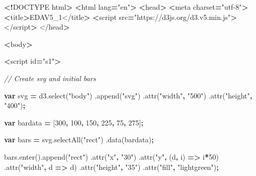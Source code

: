 \documentclass[openany]{book}
\newenvironment{Shaded}{\begin{snugshade}}{\end{snugshade}}
\newcommand{\AttributeTok}[1]{\textcolor[rgb]{0.77,0.63,0.00}{#1}}
\newcommand{\CommentTok}[1]{\textcolor[rgb]{0.56,0.35,0.01}{\textit{#1}}}
\newcommand{\DecValTok}[1]{\textcolor[rgb]{0.00,0.00,0.81}{#1}}
\newcommand{\KeywordTok}[1]{\textcolor[rgb]{0.13,0.29,0.53}{\textbf{#1}}}
\newcommand{\NormalTok}[1]{#1}
\newcommand{\OperatorTok}[1]{\textcolor[rgb]{0.81,0.36,0.00}{\textbf{#1}}}
\newcommand{\StringTok}[1]{\textcolor[rgb]{0.31,0.60,0.02}{#1}}
\newcommand{\VariableTok}[1]{\textcolor[rgb]{0.00,0.00,0.00}{#1}}
\begin{document}
\begin{Shaded}
\begin{Highlighting}[]
\OperatorTok{<!}\NormalTok{DOCTYPE html}\OperatorTok{>}
\OperatorTok{<}\NormalTok{html lang}\OperatorTok{=}\StringTok{"en"}\OperatorTok{>}
  \OperatorTok{<}\NormalTok{head}\OperatorTok{>}
    \OperatorTok{<}\NormalTok{meta charset}\OperatorTok{=}\StringTok{"utf-8"}\OperatorTok{>}
    \OperatorTok{<}\NormalTok{title}\OperatorTok{>}\NormalTok{EDAV5_1</title}\OperatorTok{>}
    \OperatorTok{<}\NormalTok{script src}\OperatorTok{=}\StringTok{"https://d3js.org/d3.v5.min.js"}\OperatorTok{>}\NormalTok{</script}\OperatorTok{>}
\NormalTok{  </head}\OperatorTok{>}

  \OperatorTok{<}\NormalTok{body}\OperatorTok{>}

    \OperatorTok{<}\NormalTok{script id}\OperatorTok{=}\StringTok{"s1"}\OperatorTok{>}

\CommentTok{// Create svg and initial bars}

\KeywordTok{var}\NormalTok{ svg }\OperatorTok{=} \VariableTok{d3}\NormalTok{.}\AttributeTok{select}\NormalTok{(}\StringTok{"body"}\NormalTok{)}
\NormalTok{  .}\AttributeTok{append}\NormalTok{(}\StringTok{"svg"}\NormalTok{)}
\NormalTok{    .}\AttributeTok{attr}\NormalTok{(}\StringTok{"width"}\OperatorTok{,} \StringTok{"500"}\NormalTok{)}
\NormalTok{    .}\AttributeTok{attr}\NormalTok{(}\StringTok{"height"}\OperatorTok{,} \StringTok{"400"}\NormalTok{)}\OperatorTok{;}

\KeywordTok{var}\NormalTok{ bardata }\OperatorTok{=}\NormalTok{ [}\DecValTok{300}\OperatorTok{,} \DecValTok{100}\OperatorTok{,} \DecValTok{150}\OperatorTok{,} \DecValTok{225}\OperatorTok{,} \DecValTok{75}\OperatorTok{,} \DecValTok{275}\NormalTok{]}\OperatorTok{;}

\KeywordTok{var}\NormalTok{ bars }\OperatorTok{=} \VariableTok{svg}\NormalTok{.}\AttributeTok{selectAll}\NormalTok{(}\StringTok{"rect"}\NormalTok{)}
\NormalTok{  .}\AttributeTok{data}\NormalTok{(bardata)}\OperatorTok{;}

\VariableTok{bars}\NormalTok{.}\AttributeTok{enter}\NormalTok{().}\AttributeTok{append}\NormalTok{(}\StringTok{"rect"}\NormalTok{)}
\NormalTok{  .}\AttributeTok{attr}\NormalTok{(}\StringTok{"x"}\OperatorTok{,} \StringTok{"30"}\NormalTok{)}
\NormalTok{  .}\AttributeTok{attr}\NormalTok{(}\StringTok{"y"}\OperatorTok{,}\NormalTok{ (d}\OperatorTok{,}\NormalTok{ i) }\OperatorTok{=>}\NormalTok{ i}\OperatorTok{*}\DecValTok{50}\NormalTok{)}
\NormalTok{  .}\AttributeTok{attr}\NormalTok{(}\StringTok{"width"}\OperatorTok{,}\NormalTok{ d }\OperatorTok{=>}\NormalTok{ d)}
\NormalTok{  .}\AttributeTok{attr}\NormalTok{(}\StringTok{"height"}\OperatorTok{,} \StringTok{"35"}\NormalTok{)}
\NormalTok{  .}\AttributeTok{attr}\NormalTok{(}\StringTok{"fill"}\OperatorTok{,} \StringTok{"lightgreen"}\NormalTok{)}\OperatorTok{;}


\end{Highlighting}
\end{Shaded}
\end{document}
